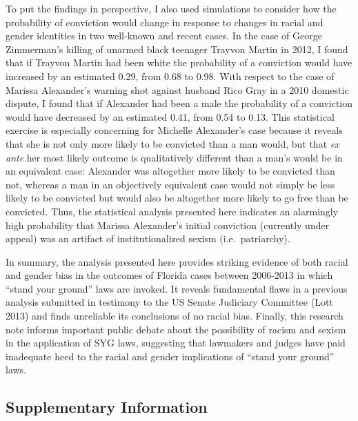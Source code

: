 \documentclass[12pt,article]{article}
\begin{document}
To put the findings in perspective, I also used simulations to consider
how the probability of conviction would change in response to changes in
racial and gender identities in two well-known and recent cases. In the
case of George Zimmerman's killing of unarmed black teenager Trayvon
Martin in 2012, I found that if Trayvon Martin had been white the
probability of a conviction would have increased by an estimated 0.29,
from 0.68 to 0.98. With respect to the case of Marissa Alexander's
warning shot against husband Rico Gray in a 2010 domestic dispute, I
found that if Alexander had been a male the probability of a conviction
would have decreased by an estimated 0.41, from 0.54 to 0.13. This
statistical exercise is especially concerning for Michelle Alexander's
case because it reveals that she is not only more likely to be convicted
than a man would, but that \emph{ex ante} her most likely outcome is
qualitatively different than a man's would be in an equivalent case:
Alexander was altogether more likely to be convicted than not, whereas a
man in an objectively equivalent case would not simply be less likely to
be convicted but would also be altogether more likely to go free than be
convicted. Thus, the statistical analysis presented here indicates an
alarmingly high probability that Marissa Alexander's initial conviction
(currently under appeal) was an artifact of institutionalized sexism
(i.e.~patriarchy).

In summary, the analysis presented here provides striking evidence of
both racial and gender bias in the outcomes of Florida cases between
2006-2013 in which ``stand your ground'' laws are invoked. It reveals
fundamental flaws in a previous analysis submitted in testimony to the
US Senate Judiciary Committee (Lott 2013) and finds unreliable its
conclusions of no racial bias. Finally, this research note informs
important public debate about the possibility of racism and sexism in
the application of SYG laws, suggesting that lawmakers and judges have
paid inadequate heed to the racial and gender implications of ``stand
your ground'' laws.

\clearpage

\subsection{Supplementary Information}\label{supplementary-information}
\end{document}
